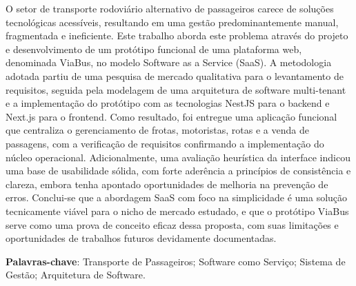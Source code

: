 \begin{resumo}
  O setor de transporte rodoviário alternativo de passageiros carece de soluções tecnológicas acessíveis, resultando em uma gestão predominantemente manual, fragmentada e ineficiente. Este trabalho aborda este problema através do projeto e desenvolvimento de um protótipo funcional de uma plataforma web, denominada ViaBus, no modelo Software as a Service (SaaS). A metodologia adotada partiu de uma pesquisa de mercado qualitativa para o levantamento de requisitos, seguida pela modelagem de uma arquitetura de software multi-tenant e a implementação do protótipo com as tecnologias NestJS para o backend e Next.js para o frontend. Como resultado, foi entregue uma aplicação funcional que centraliza o gerenciamento de frotas, motoristas, rotas e a venda de passagens, com a verificação de requisitos confirmando a implementação do núcleo operacional. Adicionalmente, uma avaliação heurística da interface indicou uma base de usabilidade sólida, com forte aderência a princípios de consistência e clareza, embora tenha apontado oportunidades de melhoria na prevenção de erros. Conclui-se que a abordagem SaaS com foco na simplicidade é uma solução tecnicamente viável para o nicho de mercado estudado, e que o protótipo ViaBus serve como uma prova de conceito eficaz dessa proposta, com suas limitações e oportunidades de trabalhos futuros devidamente documentadas.
  \vspace{\onelineskip}
  \noindent
  
  \textbf{Palavras-chave}: Transporte de Passageiros; Software como Serviço; Sistema de Gestão; Arquitetura de Software.
  \end{resumo}